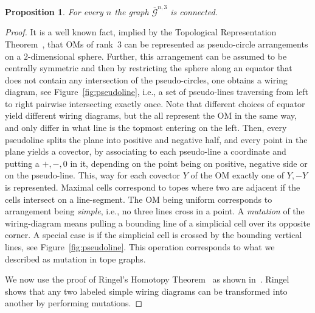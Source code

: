 \documentclass[final,11pt]{article}
\newtheorem{prop}[thm]{Proposition}%
\begin{document}
\begin{prop}\label{prop:pseudoline}
For every $n$ the graph $\overline{\mathcal{G}}^{n,3}$ is connected.
\end{prop}
\begin{proof}
 It is a well known fact, implied by the Topological Representation Theorem~\cite{fo-la-78},  that OMs of rank~3 can be represented as pseudo-circle arrangements on a $2$-dimensional sphere. Further, this arrangement can be assumed to be centrally symmetric and then by restricting the sphere along an equator that does not contain any intersection of the pseudo-circles, one obtains a wiring diagram, see Figure~\ref{fig:pseudoline}, i.e., a set of pseudo-lines traversing from left to right pairwise intersecting exactly once. Note that different choices of equator yield different wiring diagrams, but the all represent the OM in the same way, and only differ in what line is the topmost entering on the left. 
 Then, every pseudoline splits the plane into positive and negative half, and every point in the plane yields a covector, by associating to each pseudo-line a coordinate and putting a $+,-,0$ in it, depending on the point being on positive, negative side or on the pseudo-line. This, way for each covector $Y$ of the OM exactly one of $Y,-Y$ is represented. Maximal cells correspond to topes where two are adjacent if the cells intersect on a line-segment. The OM being uniform corresponds to arrangement being \emph{simple}, i.e., no three lines cross in a point.
 A \emph{mutation} of the wiring-diagram means pulling a bounding line of a simplicial cell over its opposite corner. A special case is if the simplicial cell is crossed by the bounding vertical lines, see Figure~\ref{fig:pseudoline}. This operation corresponds to what we described as mutation in tope graphs. 
 
 
 
% 

 We now use the proof of Ringel's Homotopy Theorem~\cite{Rin-56,Rin-57} as shown in~\cite[Section 6.4]{bjvestwhzi-93}. Ringel shows that any two labeled simple wiring diagrams can be transformed into another by performing mutations.
 

\end{proof}
\end{document}
